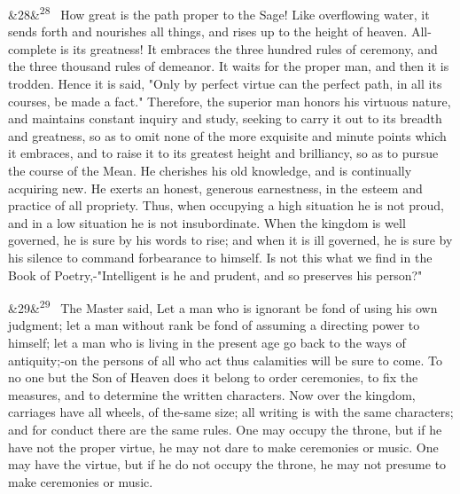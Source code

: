 \documentclass[12pt]{article}
\newcommand{\para}[1][]{\par\noindent\ifx&#1&\else\textsuperscript{\footnotesize #1}~\fi}
\begin{document}
\para[28] How great is the path proper to the Sage! Like overflowing water, it sends forth and nourishes all things, and rises up to the height of heaven. All-complete is its greatness! It embraces the three hundred rules of ceremony, and the three thousand rules of demeanor. It waits for the proper man, and then it is trodden. Hence it is said, "Only by perfect virtue can the perfect path, in all its courses, be made a fact." Therefore, the superior man honors his virtuous nature, and maintains constant inquiry and study, seeking to carry it out to its breadth and greatness, so as to omit none of the more exquisite and minute points which it embraces, and to raise it to its greatest height and brilliancy, so as to pursue the course of the Mean. He cherishes his old knowledge, and is continually acquiring new. He exerts an honest, generous earnestness, in the esteem and practice of all propriety. Thus, when occupying a high situation he is not proud, and in a low situation he is not insubordinate. When the kingdom is well governed, he is sure by his words to rise; and when it is ill governed, he is sure by his silence to command forbearance to himself. Is not this what we find in the Book of Poetry,-"Intelligent is he and prudent, and so preserves his person?"

\para[29] The Master said, Let a man who is ignorant be fond of using his own judgment; let a man without rank be fond of assuming a directing power to himself; let a man who is living in the present age go back to the ways of antiquity;-on the persons of all who act thus calamities will be sure to come. To no one but the Son of Heaven does it belong to order ceremonies, to fix the measures, and to determine the written characters. Now over the kingdom, carriages have all wheels, of the-same size; all writing is with the same characters; and for conduct there are the same rules. One may occupy the throne, but if he have not the proper virtue, he may not dare to make ceremonies or music. One may have the virtue, but if he do not occupy the throne, he may not presume to make ceremonies or music.
\end{document}
